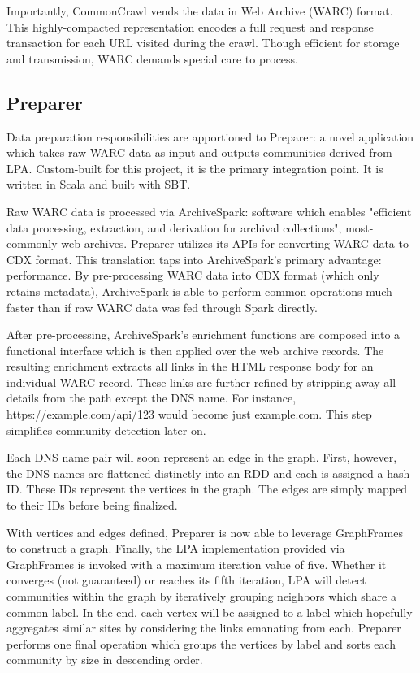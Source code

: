 \documentclass[conference]{IEEEtran}
\begin{document}
Importantly, CommonCrawl vends the data in Web Archive (WARC) format. This highly-compacted representation encodes a full request and response transaction for each URL visited during the crawl. Though efficient for storage and transmission, WARC demands special care to process.

\subsection{Preparer}

Data preparation responsibilities are apportioned to Preparer: a novel application which takes raw WARC data as input and outputs communities derived from LPA. Custom-built for this project, it is the primary integration point. It is written in Scala and built with SBT.

Raw WARC data is processed via ArchiveSpark: software which enables "efficient data processing, extraction, and derivation for archival collections", most-commonly web archives. Preparer utilizes its APIs for converting WARC data to CDX format. This translation taps into ArchiveSpark's primary advantage: performance. By pre-processing WARC data into CDX format (which only retains metadata), ArchiveSpark is able to perform common operations much faster than if raw WARC data was fed through Spark directly.

After pre-processing, ArchiveSpark's enrichment functions are composed into a functional interface which is then applied over the web archive records. The resulting enrichment extracts all links in the HTML response body for an individual WARC record. These links are further refined by stripping away all details from the path except the DNS name. For instance, https://example.com/api/123 would become just example.com. This step simplifies community detection later on.

Each DNS name pair will soon represent an edge in the graph. First, however, the DNS names are flattened distinctly into an RDD and each is assigned a hash ID. These IDs represent the vertices in the graph. The edges are simply mapped to their IDs before being finalized.

With vertices and edges defined, Preparer is now able to leverage GraphFrames to construct a graph. Finally, the LPA implementation provided via GraphFrames is invoked with a maximum iteration value of five. Whether it converges (not guaranteed) or reaches its fifth iteration, LPA will detect communities within the graph by iteratively grouping neighbors which share a common label. In the end, each vertex will be assigned to a label which hopefully aggregates similar sites by considering the links emanating from each. Preparer performs one final operation which groups the vertices by label and sorts each community by size in descending order.
\end{document}
